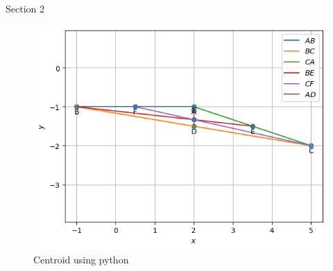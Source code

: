 \begin{table}[H]
    \centering
    
    \caption{Section 2}
    \label{tab:Section2}
\end{table}
\begin{figure}[H]
\includegraphics[width=\columnwidth]{section2/figs/section2.png}
\caption{Centroid using python}
\label{fig:Centroid_plot}
\end{figure}